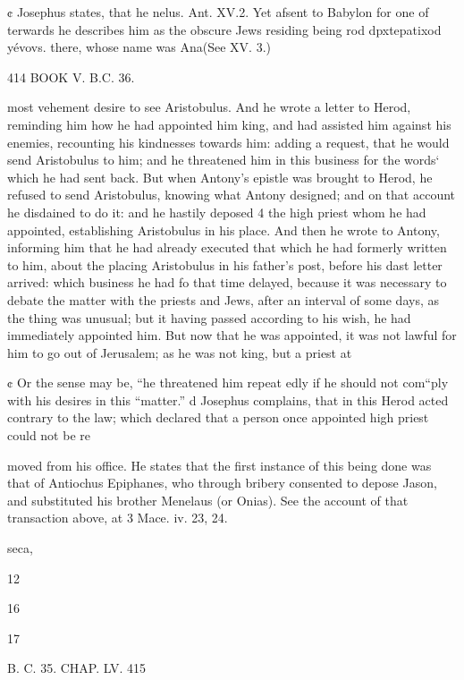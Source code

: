 ¢ Josephus states, that he nelus. Ant. XV.2. Yet afsent to Babylon for one of terwards he describes him as the obscure Jews residing being rod dpxtepatixod yévovs. there, whose name was Ana(See XV. 3.) 

414 BOOK V. B.C. 36. 

most vehement desire to see Aristobulus. And he wrote a letter to Herod, reminding him how he had appointed him king, and had assisted him against his enemies, recounting his kindnesses towards him: adding a request, that he would send Aristobulus to him; and he threatened him in this business for the words‘ which he had sent back. 
But when Antony’s epistle was brought to Herod, he refused to send Aristobulus, knowing what Antony designed; and on that account he disdained to do it: and he hastily deposed 4 the high priest whom he had appointed, establishing Aristobulus in his place. 
And then he wrote to Antony, informing him that he had already executed that which he had formerly written to him, about the placing Aristobulus in his father’s post, before his dast letter arrived: which business he had fo that time delayed, because it was necessary to debate the matter with the priests and Jews, after an interval of some days, as the thing was unusual; but it having passed according to his wish, he had immediately appointed him. But now that he was appointed, it was not lawful for him to go out of Jerusalem; as he was not king, but a priest at

¢ Or the sense may be, “he threatened him repeat edly if he should not com“ply with his desires in this “matter.” 
d Josephus complains, that in this Herod acted contrary to the law; which declared that a person once appointed high priest could not be re

moved from his office. He states that the first instance of this being done was that of Antiochus Epiphanes, who through bribery consented to depose Jason, and substituted his brother Menelaus (or Onias). See the account of that transaction above, at 3 Mace. iv. 23, 24. 

seca, 

12 

16 

17 

B. C. 35. CHAP. LV. 415 


